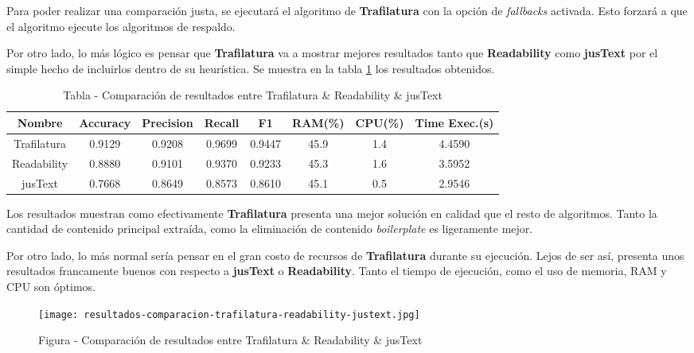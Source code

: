 Para poder realizar una comparación justa, se ejecutará el algoritmo de \textbf{Trafilatura} con la opción
de \emph{fallbacks} activada. Esto forzará a que el algoritmo ejecute los algoritmos de respaldo. 

Por otro lado, lo más lógico es pensar que \textbf{Trafilatura} va a mostrar mejores resultados tanto que
\textbf{Readability} como \textbf{jusText} por el simple hecho de incluirlos dentro de su heurística. Se
muestra en la tabla \ref{tab:tabla - comparacion de resultados entre trafilatura y readability y justext}
los resultados obtenidos.

\begin{table}[h]
    \begin{center}
      \begin{tabular}{| c | c | c | c | c | c | c | c |} \hline 
       \textbf{Nombre} & \textbf{Accuracy} & \textbf{Precision}  & \textbf{Recall} & \textbf{F1} & \textbf{RAM(\%)} & \textbf{CPU(\%)} & \textbf{Time Exec.(s)} \\ \hline
       Trafilatura & 0.9129 & 0.9208 & 0.9699 & 0.9447 & 45.9 & 1.4 & 4.4590 \\ \hline
       Readability & 0.8880 & 0.9101 & 0.9370 & 0.9233 & 45.3 & 1.6 & 3.5952 \\ \hline
       jusText & 0.7668 & 0.8649 & 0.8573 & 0.8610 & 45.1 & 0.5 & 2.9546 \\ \hline
      \end{tabular}
      \caption{Tabla - Comparación de resultados entre Trafilatura \& Readability \& jusText}
      \label{tab:tabla - comparacion de resultados entre trafilatura y readability y justext}
    \end{center}
\end{table}

Los resultados muestran como efectivamente \textbf{Trafilatura} presenta una mejor solución en calidad que
el resto de algoritmos. Tanto la cantidad de contenido principal extraída, como la eliminación de contenido
\emph{boilerplate} es ligeramente mejor. 

Por otro lado, lo más normal sería pensar en el gran costo de recursos de \textbf{Trafilatura} durante su
ejecución. Lejos de ser así, presenta unos resultados francamente buenos con respecto a \textbf{jusText}
o \textbf{Readability}. Tanto el tiempo de ejecución, como el uso de memoria, RAM y CPU son óptimos.

\begin{figure}[tphb]
    \centering
    \texttt{[image: resultados-comparacion-trafilatura-readability-justext.jpg]}
    \caption{Figura - Comparación de resultados entre Trafilatura \& Readability \& jusText}
    \label{img:figura - comparacion de resultados entre trafilatura y readability y justext}
\end{figure}

